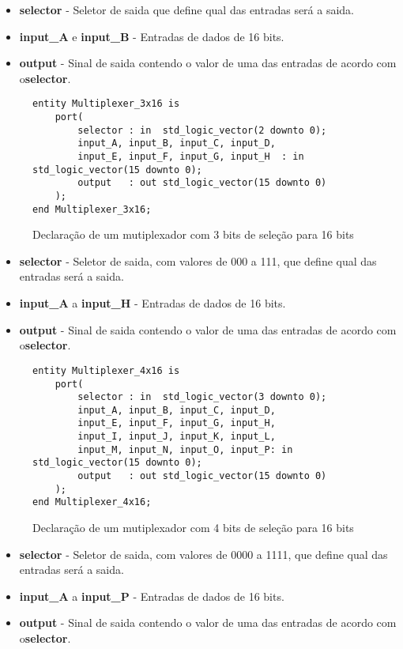 \documentclass{article}
\begin{document}
				\begin{itemize}
					\item \textbf{selector} - Seletor de saida que define qual das entradas ser\'{a} a saida.
					\item \textbf{input\_A} e \textbf{input\_B} - Entradas de dados de 16 bits.
					\item \textbf{output} - Sinal de saida contendo o valor de uma das entradas de acordo com o\textbf{selector}.
				\end{itemize}
				\begin{figure}[H]
					\centering
					\caption[Mutiplexador com 3 bits de sele\c{c}\~{a}o para 16 bits]{Declara\c{c}\~{a}o de um mutiplexador com 3 bits de sele\c{c}\~{a}o para 16 bits}
					\label{fig:Multiplexer_3x16}
					\begin{lstlisting}[style=vhdl]
entity Multiplexer_3x16 is
	port(
		selector : in  std_logic_vector(2 downto 0);
		input_A, input_B, input_C, input_D,
		input_E, input_F, input_G, input_H  : in  std_logic_vector(15 downto 0);
		output   : out std_logic_vector(15 downto 0)
	);
end Multiplexer_3x16;
					\end{lstlisting}
				\end{figure}
				\begin{itemize}
					\item \textbf{selector} - Seletor de saida, com valores de 000 a 111, que define qual das entradas ser\'{a} a saida.
					\item \textbf{input\_A} a \textbf{input\_H} - Entradas de dados de 16 bits.
					\item \textbf{output} - Sinal de saida contendo o valor de uma das entradas de acordo com o\textbf{selector}.
				\end{itemize}
				\begin{figure}[H]
					\centering
					\caption[Mutiplexador com 4 bits de sele\c{c}\~{a}o para 16 bits]{Declara\c{c}\~{a}o de um mutiplexador com 4 bits de sele\c{c}\~{a}o para 16 bits}
					\label{fig:Multiplexer_4x16}
					\begin{lstlisting}[style=vhdl]
entity Multiplexer_4x16 is
	port(
		selector : in  std_logic_vector(3 downto 0);
		input_A, input_B, input_C, input_D, 
		input_E, input_F, input_G, input_H,
		input_I, input_J, input_K, input_L, 
		input_M, input_N, input_O, input_P: in  std_logic_vector(15 downto 0);
		output   : out std_logic_vector(15 downto 0)
	);
end Multiplexer_4x16;
					\end{lstlisting}
				\end{figure}
				\begin{itemize}
					\item \textbf{selector} - Seletor de saida, com valores de 0000 a 1111, que define qual das entradas ser\'{a} a saida.
					\item \textbf{input\_A} a \textbf{input\_P} - Entradas de dados de 16 bits.
					\item \textbf{output} - Sinal de saida contendo o valor de uma das entradas de acordo com o\textbf{selector}.
				\end{itemize}
\end{document}
